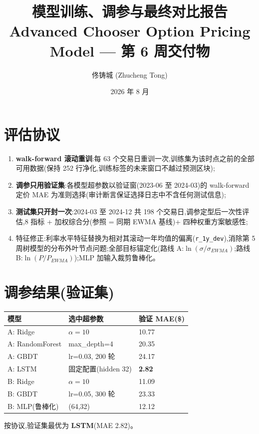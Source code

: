 \documentclass[11pt]{ctexart}
\title{\textbf{模型训练、调参与最终对比报告}\\
\large Advanced Chooser Option Pricing Model --- 第 6 周交付物}
\author{佟铸城 (Zhucheng Tong)}
\date{2026 年 8 月}
\begin{document}
\maketitle

\section{评估协议}
\begin{enumerate}
  \item \textbf{walk-forward 滚动重训}:每 63 个交易日重训一次,训练集为该时点之前的全部可用数据(保持 252 行净化,训练标签的未来窗口不越过预测区块);
  \item \textbf{调参只用验证集}:各模型超参数以验证窗(2023-06 至 2024-03)的 walk-forward 定价 MAE 为准则选择(审计断言保证选择日志中不含任何测试信息);
  \item \textbf{测试集只开封一次}:2024-03 至 2024-12 共 198 个交易日,调参定型后一次性评估,8 指标 + 加权综合分(参照 = 同期 EWMA 基线)+ 四种权重方案敏感性;
  \item 特征修正:利率水平特征替换为相对其滚动一年均值的偏离(\texttt{r\_1y\_dev}),消除第 5 周树模型的分布外叶节点问题;全部目标锚定化(路线 A:$\ln(\sigma/\sigma_{EWMA})$;路线 B:$\ln(P/P_{EWMA})$);MLP 加输入裁剪鲁棒化。
\end{enumerate}

\section{调参结果(验证集)}
\begin{center}
\small
\begin{tabular}{lll}
\toprule
\textbf{模型} & \textbf{选中超参数} & \textbf{验证 MAE(\$)} \\
\midrule
A: Ridge & $\alpha=10$ & 10.77 \\
A: RandomForest & max\_depth=4 & 20.35 \\
A: GBDT & lr=0.03, 200 轮 & 24.17 \\
A: LSTM & 固定配置(hidden 32) & \textbf{2.82} \\
B: Ridge & $\alpha=10$ & 11.09 \\
B: GBDT & lr=0.05, 300 轮 & 23.33 \\
B: MLP(鲁棒化) & (64,32) & 12.12 \\
\bottomrule
\end{tabular}
\end{center}
按协议,验证集最优为 \textbf{LSTM}(MAE 2.82)。
\end{document}
